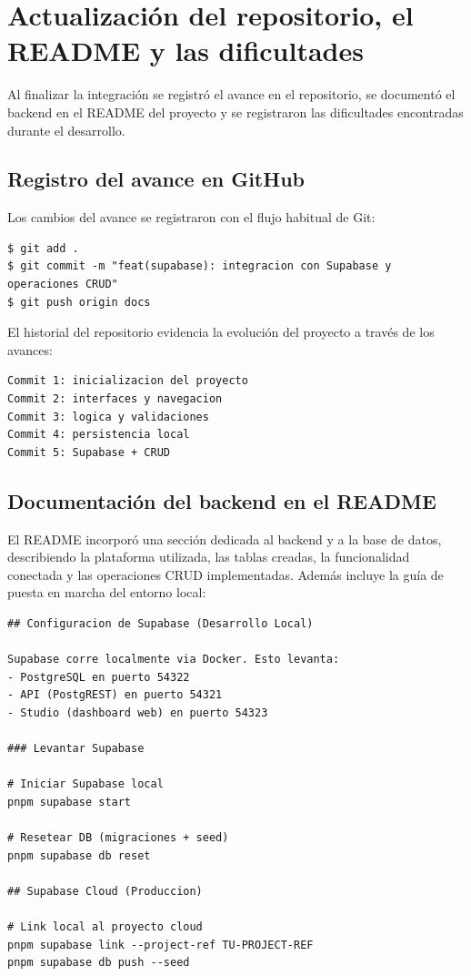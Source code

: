 
\section{Actualizaci\'on del repositorio, el README y las dificultades}

Al finalizar la integraci\'on se registr\'o el avance en el repositorio,
se document\'o el backend en el README del proyecto y se registraron las
dificultades encontradas durante el desarrollo.

\subsection{Registro del avance en GitHub}

Los cambios del avance se registraron con el flujo habitual de Git:

\begin{lstlisting}[style=terminal]
$ git add .
$ git commit -m "feat(supabase): integracion con Supabase y operaciones CRUD"
$ git push origin docs
\end{lstlisting}

El historial del repositorio evidencia la evoluci\'on del proyecto a
trav\'es de los avances:

\begin{lstlisting}[style=terminal]
Commit 1: inicializacion del proyecto
Commit 2: interfaces y navegacion
Commit 3: logica y validaciones
Commit 4: persistencia local
Commit 5: Supabase + CRUD
\end{lstlisting}

\subsection{Documentaci\'on del backend en el README}

El README incorpor\'o una secci\'on dedicada al backend y a la base de
datos, describiendo la plataforma utilizada, las tablas creadas, la
funcionalidad conectada y las operaciones CRUD implementadas. Adem\'as
incluye la gu\'ia de puesta en marcha del entorno local:

\begin{lstlisting}
## Configuracion de Supabase (Desarrollo Local)

Supabase corre localmente via Docker. Esto levanta:
- PostgreSQL en puerto 54322
- API (PostgREST) en puerto 54321
- Studio (dashboard web) en puerto 54323

### Levantar Supabase

# Iniciar Supabase local
pnpm supabase start

# Resetear DB (migraciones + seed)
pnpm supabase db reset

## Supabase Cloud (Produccion)

# Link local al proyecto cloud
pnpm supabase link --project-ref TU-PROJECT-REF
pnpm supabase db push --seed
\end{lstlisting}

